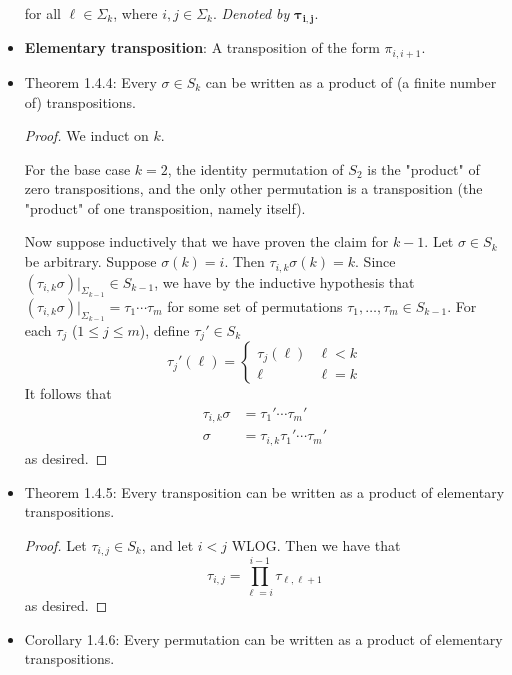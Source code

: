 \documentclass[../notes.tex]{subfiles}
\begin{document}
\begin{itemize}
\begin{equation*}
    \end{equation*}
    for all $\ell\in\Sigma_k$, where $i,j\in\Sigma_k$. \emph{Denoted by} $\bm{\tau_{i,j}}$.
    \item \textbf{Elementary transposition}: A transposition of the form $\pi_{i,i+1}$.
    \item Theorem 1.4.4: Every $\sigma\in S_k$ can be written as a product of (a finite number of) transpositions.
    \begin{proof}
        We induct on $k$.\par
        For the base case $k=2$, the identity permutation of $S_2$ is the "product" of zero transpositions, and the only other permutation is a transposition (the "product" of one transposition, namely itself).\par
        Now suppose inductively that we have proven the claim for $k-1$. Let $\sigma\in S_k$ be arbitrary. Suppose $\sigma(k)=i$. Then $\tau_{i,k}\sigma(k)=k$. Since $(\tau_{i,k}\sigma)|_{\Sigma_{k-1}}\in S_{k-1}$, we have by the inductive hypothesis that $(\tau_{i,k}\sigma)|_{\Sigma_{k-1}}=\tau_1\cdots\tau_m$ for some set of permutations $\tau_1,\dots,\tau_m\in S_{k-1}$. For each $\tau_j$ ($1\leq j\leq m$), define $\tau_j'\in S_k$
        \begin{equation*}
            \tau_j'(\ell) =
            \begin{cases}
                \tau_j(\ell) & \ell<k\\
                \ell & \ell=k
            \end{cases}
        \end{equation*}
        It follows that
        \begin{align*}
            \tau_{i,k}\sigma &= \tau_1'\cdots\tau_m'\\
            \sigma &= \tau_{i,k}\tau_1'\cdots\tau_m'
        \end{align*}
        as desired.
    \end{proof}
    \item Theorem 1.4.5: Every transposition can be written as a product of elementary transpositions.
    \begin{proof}
        Let $\tau_{i,j}\in S_k$, and let $i<j$ WLOG. Then we have that
        \begin{equation*}
            \tau_{i,j} = \prod_{\ell=i}^{i-1}\tau_{\ell,\ell+1}
        \end{equation*}
        as desired.
    \end{proof}
    \item Corollary 1.4.6: Every permutation can be written as a product of elementary transpositions.

\end{itemize}
\end{document}
